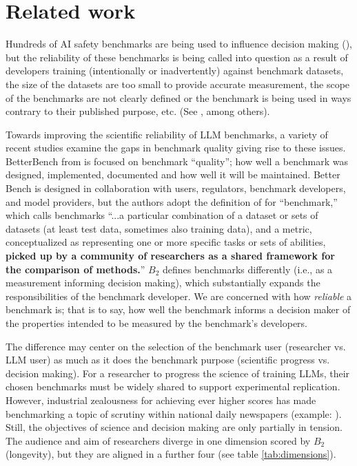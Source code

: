\documentclass{article}
\newcommand\bb{$B_2$ }
\begin{document}
\section{Related work}

Hundreds of AI safety benchmarks are being used to influence decision making (\cite{rottger2024safetyprompts,bommasani2024foundation}), but the reliability of these benchmarks is being called into question as a result of developers training (intentionally or inadvertently) against benchmark datasets, the size of the datasets are too small to provide accurate measurement, the scope of the benchmarks are not clearly defined or the benchmark is being used in ways contrary to their published purpose, etc. (See \cite{raji2021ai,liao2023rethinking,mcintosh2024inadequacies,banerjee2024vulnerability,balloccu2024leak,nytimesAIMeasurement,hardy2024more,themarkupEveryoneJudging,anthropicChallengesEvaluating}, among others).

Towards improving the scientific reliability of LLM benchmarks, a variety of recent studies examine the gaps in benchmark quality giving rise to these issues. BetterBench from \cite{reuel2024betterbench} is focused on benchmark ``quality''; how well a benchmark was designed, implemented, documented and how well it will be maintained. Better Bench is designed in collaboration with users, regulators, benchmark developers, and model providers, but the authors adopt the definition of \cite{raji2021ai} for ``benchmark,'' which calls benchmarks ``...a particular combination of a dataset or sets of datasets (at least test data, sometimes also training data), and a metric, conceptualized as representing one or more specific tasks or sets of abilities, \textbf{picked up by a community of researchers as a shared framework for the comparison of methods.}'' \bb defines benchmarks differently (i.e., as a measurement informing decision making), which substantially expands the responsibilities of the benchmark developer. We are concerned with how \textit{reliable} a benchmark is; that is to say, how well the benchmark informs a decision maker of the properties intended to be measured by the benchmark's developers.

The difference may center on the selection of the benchmark user (researcher vs. LLM user) as much as it does the benchmark purpose (scientific progress vs. decision making). For a researcher to progress the science of training LLMs, their chosen benchmarks must be widely shared to support experimental replication. However, industrial zealousness for achieving ever higher scores has made benchmarking a topic of scrutiny within national daily newspapers (example: \cite{nytimesAIMeasurement}). Still, the objectives of science and decision making are only partially in tension. The audience and aim of researchers diverge in one dimension scored by \bb (longevity), but they are aligned in a further four (see table \ref{tab:dimensions}).
\end{document}
